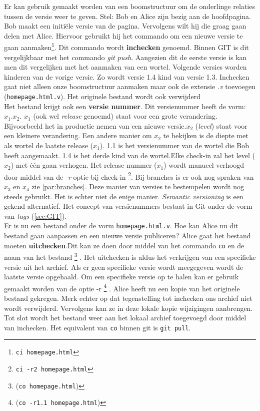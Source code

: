 Er kan gebruik gemaakt worden van een boomstructuur om de onderlinge relaties tussen de versie weer te geven. Stel: Bob en Alice zijn bezig aan de hoofdpagina. Bob maakt een initiële versie van de pagina. Vervolgens wilt hij die graag gaan delen met Alice. Hiervoor gebruikt hij het commando om een nieuwe versie te gaan aanmaken\footnote{\Verb+ci homepage.html+}. Dit commando wordt \textbf{inchecken} genoemd. Binnen GIT is dit vergelijkbaar met het commando \textit{git push}. Aangezien dit de eerste versie is kan men dit vergelijken met het aanmaken van een wortel. Volgende versies worden kinderen van de vorige versie. Zo wordt versie 1.4 kind van versie 1.3. Inchecken gaat niet alleen onze boomstructuur aanmaken maar ook de extensie \textit{.v} toevoegen (\verb+homepage.html.v+). Het originele bestand wordt ook verwijderd\\

Het bestand krijgt ook een \textbf{versie nummer}. Dit versienummer heeft de vorm: $x_1.x_2$. $x_1$ (ook wel \textit{release} genoemd) staat voor een grote verandering. Bijvoorbeeld het in productie nemen van een nieuwe versie.$x_2$ (\textit{level}) staat voor een kleinere verandering. Een andere manier om $x_2$ te bekijken is de diepte met als wortel de laatste release ($x_1$). 1.1 is het versienummer van de wortel die Bob heeft aangemaakt. 1.4 is het derde kind van de wortel.Elke check-in zal het level ($x_2$) met één gaan verhogen.   Het release nummer ($x_1$) wordt manueel verhoogd door middel van de \textit{-r} optie bij check-in \footnote{\Verb+ci -r2 homepage.html+}. Bij branches is er ook nog spraken van $x_3$ en $x_4$ zie \ref{par:branches}. Deze manier van versies te bestempelen wordt nog steeds gebruikt. Het is echter niet de enige manier. \textit{Semantic versioning} is een gekend alternatief. Het concept van versienummers bestaat in Git onder de vorm van \textit{tags} (\ref{sec:GIT}).\\

Er is nu een bestand onder de vorm \verb+homepage.html.v+. Hoe kan Alice nu dit bestand gaan aanpassen en een nieuwe versie publiceren? Alice gaat het bestand moeten \textbf{uitchecken}.Dit kan ze doen door middel van het commando \verb+co+ en de naam van het bestand \footnote{(\Verb+co homepage.html+)} . Het uitchecken is aldus het verkrijgen van een specifieke versie uit het archief. Als er geen specifieke versie wordt meegegeven wordt de laatste versie opgehaald. Om een specifieke versie op te halen kan er gebruik gemaakt worden van de optie -r  \footnote{(\Verb+co -r1.1 homepage.html+)} . Alice heeft nu een kopie van het originele bestand gekregen. Merk echter op dat tegenstelling tot inchecken ons archief niet wordt verwijderd. Vervolgens kan ze in deze lokale kopie wijzigingen aanbrengen. Tot slot wordt het bestand weer aan het lokaal archief toegevoegd door middel van inchecken. Het equivalent van \verb+co+ binnen git is \verb+git pull+.\\

